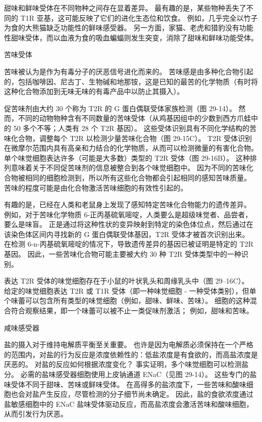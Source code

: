 甜味和鲜味受体在不同物种之间存在显着差异。 最有趣的是，某些物种丢失了不同的 T1R 亚基，这可能反映了它们的进化生态位和饮食。 例如，几乎完全以竹子为食的大熊猫缺乏功能性的鲜味感受器。 另一方面，家猫、老虎和猎豹没有功能性甜味受体，而以血液为食的吸血蝙蝠则发生突变，消除了甜味和鲜味功能受体。

苦味受体

苦味被认为是作为有毒分子的厌恶信号进化而来的。 苦味感是由多种化合物引起的，包括咖啡因、尼古丁、生物碱和地那铵，这是已知的最苦的化学物质（有时将这种化合物添加到无味无味的有毒产品中以防止其摄入）。

促苦味剂由大约 30 个称为 T2R 的 G 蛋白偶联受体家族检测（图 29-14）。 然而，不同的动物物种含有不同数量的苦味受体（从鸡基因组中的少数到西方爪蛙中的 50 多个不等；人类有 28 个 T2R 基因）。 这些受体识别具有不同化学结构的苦味化合物，调整每个 T2R 以检测少量苦味化合物（图 29-15C）。 T2R 受体识别在微摩尔范围内具有高亲和力结合的化学物质，从而可以检测微量的有害化合物。 单个味觉细胞表达许多（可能是大多数）类型的 T2R 受体（图 29-16B）。 这种排列意味着关于不同促苦味剂的信息被整合到各个味觉细胞中。 因为不同的苦味化合物被相同的细胞检测到，所以所有这些化合物都会引起相同的感知苦味质量。 苦味的程度可能是由化合物激活苦味细胞的有效性引起的。

有趣的是，已经在人类和老鼠身上发现了感知特定苦味化合物能力的遗传差异。 例如，对于苦味化学物质 6-正丙基硫氧嘧啶，人类要么是超级味觉者、品尝者，要么是味盲。 正是通过将这种性状的变异映射到特定的染色体位点，然后通过在该染色体区间内寻找新的 G 蛋白偶联受体基因，T2R 受体才被首次识别出来。 在检测 6-n-丙基硫氧嘧啶的情况下，导致遗传差异的基因已被证明是特定的 T2R 基因。 因此，一些苦味化合物可能主要被大约 30 种 T2R 受体类型中的一种识别。

表达 T2R 受体的味觉细胞存在于小鼠的叶状乳头和周缘乳头中（图 29–16C）。 给定的味觉细胞表达 T2R 或 T1R 受体（即一种味觉细胞 - 一种受体类别），但单个味蕾可以包含所有类型的味觉细胞（例如，甜味、鲜味、苦味）。 细胞的这种混合符合观察结果，即一个味蕾可以被不止一类促味剂激活； 例如，甜味和苦味。

咸味感受器

盐的摄入对于维持电解质平衡至关重要。 也许是因为电解质必须保持在一个严格的范围内，对盐的行为反应是浓度依赖性的：低盐浓度是有食欲的，而高盐浓度是厌恶的。 对盐的反应如何根据浓度变化？ 事实证明，多个味觉细胞可以检测盐分。 必需的盐味感受器细胞使用上皮钠通道 ENaC（见图 29-14）。 这些专门的盐味受体不同于甜味、苦味或鲜味受体。 在高得多的盐浓度下，一些苦味和酸味细胞也会对盐产生反应，尽管检测的分子细节尚未确定。 因此，盐的食欲浓度通过盐敏感细胞中的 ENaC 盐味受体驱动反应，而高盐浓度会激活苦味和酸味细胞，从而引发行为厌恶。

